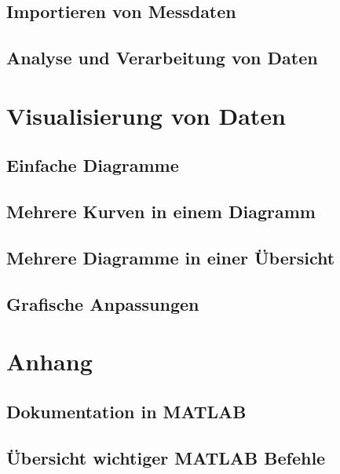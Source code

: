 \documentclass[12pt, a4paper, twoside]{article}
\begin{document}
        \subsection{Importieren von Messdaten}
        \subsection{Analyse und Verarbeitung von Daten}
    \section{Visualisierung von Daten}
        \subsection{Einfache Diagramme}
        \subsection{Mehrere Kurven in einem Diagramm}
        \subsection{Mehrere Diagramme in einer Übersicht}
        \subsection{Grafische Anpassungen}
    \section{Anhang}
        \subsection{Dokumentation in MATLAB}
        \subsection{Übersicht wichtiger MATLAB Befehle}
\end{document}
